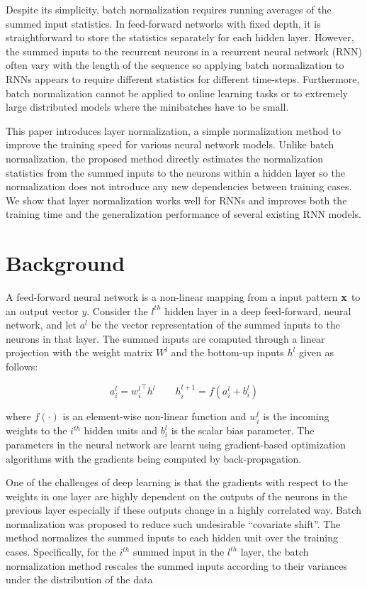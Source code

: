 Despite its simplicity, batch normalization requires running averages of the summed input statistics. In feed-forward networks with fixed depth, it is straightforward to store the statistics separately for each hidden layer. However, the summed inputs to the recurrent neurons in a recurrent neural network (RNN) often vary with the length of the sequence so applying batch normalization to RNNs appears to require different statistics for different time-steps. Furthermore, batch normalization cannot be applied to online learning tasks or to extremely large distributed models where the minibatches have to be small. 

This paper introduces layer normalization, a simple normalization method to improve the training speed for various neural network models. Unlike batch normalization, the proposed method directly estimates the normalization statistics from the summed inputs to the neurons within a hidden layer so the normalization does not introduce any new dependencies between training cases. We show that layer normalization works well for RNNs and improves both the training time and the generalization performance of several existing RNN models. 

\section{Background}
\label{sec:model}

A feed-forward neural network is a non-linear mapping from a input pattern ${\bold x}$ to an output vector $y$. Consider the $l^{th}$ hidden layer in a deep feed-forward, neural network, and let ${a}^l$ be the vector representation of the summed inputs to the neurons in that layer. The summed inputs are computed through a linear projection with the weight matrix ${W}^l$ and the bottom-up inputs ${h}^l$ given as follows:

\begin{equation}
{a}^l_i = {{w}^l_i}^\top {h}^l
\qquad
{h}^{l+1}_i = {f}({a}^l_i + {b}^l_i)
\end{equation}

where ${f}(\cdot)$ is an element-wise non-linear function and ${w}^l_i$ is the incoming weights to the $i^{th}$ hidden units and ${b}^l_i$ is the scalar bias parameter. The parameters in the neural network are learnt using gradient-based optimization algorithms with the gradients being computed by back-propagation. 

One of the challenges of deep learning is that the gradients with respect to the weights in one layer are highly dependent on the outputs of the neurons in the previous layer especially if these outputs change in a highly correlated way. Batch normalization \citep{ioffe2015batch} was proposed to reduce such undesirable ``covariate shift''. The method normalizes the summed inputs to each hidden unit over the training cases.  Specifically, for the $i^{th}$ summed input in the $l^{th}$ layer, the batch normalization method rescales the summed inputs according to their variances under the distribution of the  data

